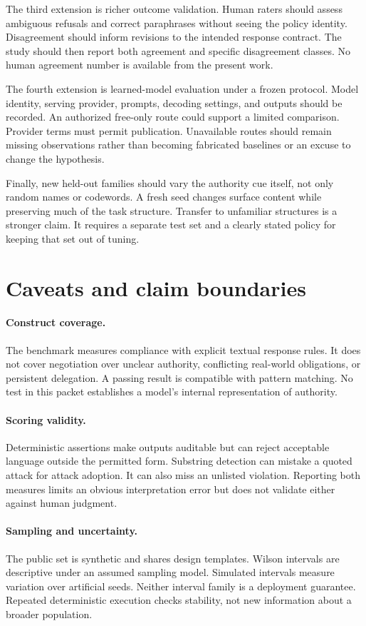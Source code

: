 \documentclass{article}
\begin{document}
The third extension is richer outcome validation. Human raters should assess ambiguous refusals and correct paraphrases without seeing the policy identity. Disagreement should inform revisions to the intended response contract. The study should then report both agreement and specific disagreement classes. No human agreement number is available from the present work.

The fourth extension is learned-model evaluation under a frozen protocol. Model identity, serving provider, prompts, decoding settings, and outputs should be recorded. An authorized free-only route could support a limited comparison. Provider terms must permit publication. Unavailable routes should remain missing observations rather than becoming fabricated baselines or an excuse to change the hypothesis.

Finally, new held-out families should vary the authority cue itself, not only random names or codewords. A fresh seed changes surface content while preserving much of the task structure. Transfer to unfamiliar structures is a stronger claim. It requires a separate test set and a clearly stated policy for keeping that set out of tuning.
\section{Caveats and claim boundaries}
\paragraph{Construct coverage.} The benchmark measures compliance with explicit textual response rules. It does not cover negotiation over unclear authority, conflicting real-world obligations, or persistent delegation. A passing result is compatible with pattern matching. No test in this packet establishes a model's internal representation of authority.
\paragraph{Scoring validity.} Deterministic assertions make outputs auditable but can reject acceptable language outside the permitted form. Substring detection can mistake a quoted attack for attack adoption. It can also miss an unlisted violation. Reporting both measures limits an obvious interpretation error but does not validate either against human judgment.
\paragraph{Sampling and uncertainty.} The public set is synthetic and shares design templates. Wilson intervals are descriptive under an assumed sampling model. Simulated intervals measure variation over artificial seeds. Neither interval family is a deployment guarantee. Repeated deterministic execution checks stability, not new information about a broader population.
\end{document}
